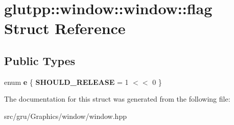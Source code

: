 \hypertarget{structglutpp_1_1window_1_1window_1_1flag}{\section{glutpp\-:\-:window\-:\-:window\-:\-:flag \-Struct \-Reference}
\label{structglutpp_1_1window_1_1window_1_1flag}
}
\subsection*{\-Public \-Types}
\begin{DoxyCompactItemize}
\item 
enum {\bfseries e} \{ {\bfseries \-S\-H\-O\-U\-L\-D\-\_\-\-R\-E\-L\-E\-A\-S\-E} =  1 $<$$<$ 0
 \}
\end{DoxyCompactItemize}


\-The documentation for this struct was generated from the following file\-:\begin{DoxyCompactItemize}
\item 
src/gru/\-Graphics/window/window.\-hpp\end{DoxyCompactItemize}
